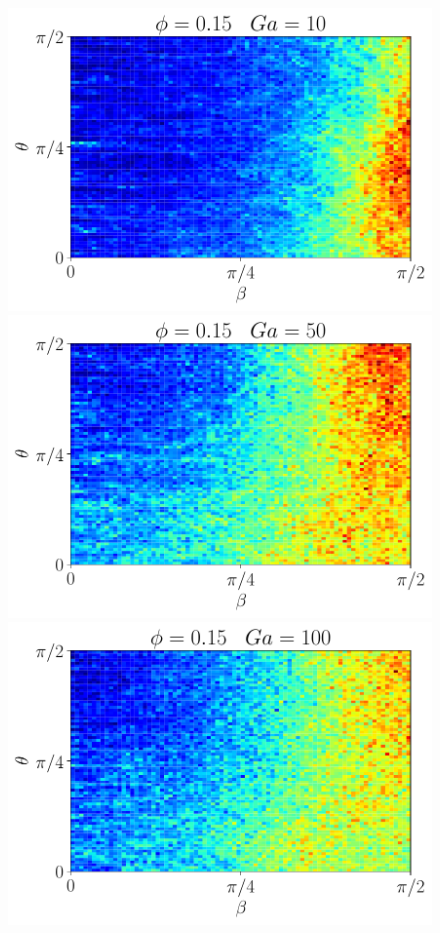 \begin{figure}[h!]
    \includegraphics[height =\size]{image/N_10/beta/2DMAP_beta_theta_dmin_10_Bo0_5PHI0_15mu_r0_42Ga10.pdf}
    \includegraphics[height =\size]{image/N_10/beta/2DMAP_beta_theta_dmin_10_Bo0_5PHI0_15mu_r0_42Ga50.pdf}
    \includegraphics[height =\size]{image/N_10/beta/2DMAP_beta_theta_dmin_10_Bo0_5PHI0_15mu_r0_42Ga100.pdf}

\end{figure}
